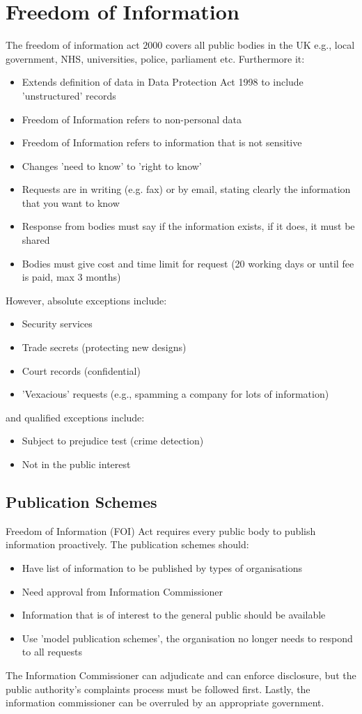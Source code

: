 \documentclass[a4paper]{article}
\theoremstyle{plain}
\theoremstyle{definition}
\theoremstyle{remark}
\begin{document}
\section{Freedom of Information}
The freedom of information act $2000$ covers all public bodies in the UK e.g., local government, NHS, universities, police, parliament etc. Furthermore it:
\begin{itemize}
	\item Extends definition of data in Data Protection Act 1998 to include 'unstructured' records
	\item Freedom of Information refers to non-personal data
	\item Freedom of Information refers to information that is not sensitive
	\item Changes 'need to know' to 'right to know'
	\item Requests are in writing (e.g. fax) or by email, stating clearly the information that you want to know
	\item Response from bodies must say if the information exists, if it does, it must be shared
	\item Bodies must give cost and time limit for request (20 working days or until fee is paid, max 3 months)
\end{itemize}
However, absolute exceptions include:
\begin{itemize}
	\item Security services
	\item Trade secrets (protecting new designs)
	\item Court records (confidential)
	\item 'Vexacious' requests (e.g., spamming a company for lots of information)
\end{itemize}
and qualified exceptions include:
\begin{itemize}
\item Subject to prejudice test (crime detection)
\item Not in the public interest
\end{itemize}
\subsection{Publication Schemes}
Freedom of Information (FOI) Act requires every public body to publish information proactively. The publication schemes should:
\begin{itemize}
\item Have list of information to be published by types of organisations
\item Need approval from Information Commissioner
\item Information that is of interest to the general public should be available
\item Use 'model publication schemes', the organisation no longer needs to respond to all requests
\end{itemize}
The Information Commissioner can adjudicate and can enforce disclosure, but the public authority's complaints process must be followed first. Lastly, the information commissioner can be overruled by an appropriate government.
\end{document}
